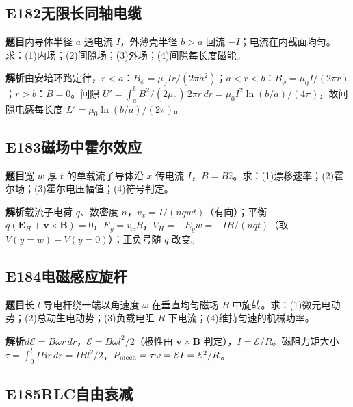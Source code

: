 \par\medskip

\subsection*{E182\quad 无限长同轴电缆}

\textbf{题目}\quad 内导体半径 $a$ 通电流 $I$，外薄壳半径 $b>a$ 回流 $-I$；电流在内截面均匀。求：(1)内场；(2)间隙场；(3)外场；(4)间隙每长度磁能。

\par\textbf{解析}\quad 由安培环路定律，$r<a$：$B_\phi=\mu_0Ir/(2\pi a^2)$；$a<r<b$：$B_\phi=\mu_0I/(2\pi r)$；$r>b$：$B=0$。间隙 $U'=\int_a^b B^2/(2\mu_0)\,2\pi r\,dr=\mu_0I^2\ln(b/a)/(4\pi)$，故间隙电感每长度 $L'=\mu_0\ln(b/a)/(2\pi)$。

\par\medskip

\subsection*{E183\quad 磁场中霍尔效应}

\textbf{题目}\quad 宽 $w$ 厚 $t$ 的单载流子导体沿 $x$ 传电流 $I$，$B=B\hat z$。求：(1)漂移速率；(2)霍尔场；(3)霍尔电压幅值；(4)符号判定。

\par\textbf{解析}\quad 载流子电荷 $q$、数密度 $n$，$v_x=I/(nqwt)$（有向）；平衡 $q(\mathbf E_H+\mathbf v\times\mathbf B)=0$，$E_y=v_xB$，$V_H=-E_yw=-IB/(nqt)$（取 $V(y=w)-V(y=0)$）；正负号随 $q$ 改变。

\par\medskip

\subsection*{E184\quad 电磁感应旋杆}

\textbf{题目}\quad 长 $l$ 导电杆绕一端以角速度 $\omega$ 在垂直均匀磁场 $B$ 中旋转。求：(1)微元电动势；(2)总动生电动势；(3)负载电阻 $R$ 下电流；(4)维持匀速的机械功率。

\par\textbf{解析}\quad $d\mathcal E=B\omega r\,dr$，$\mathcal E=B\omega l^2/2$（极性由 $\mathbf v\times\mathbf B$ 判定），$I=\mathcal E/R$。磁阻力矩大小 $\tau=\int_0^l IBr\,dr=IBl^2/2$，$P_{\rm mech}=\tau\omega=\mathcal E I=\mathcal E^2/R$。

\par\medskip

\subsection*{E185\quad RLC自由衰减}

